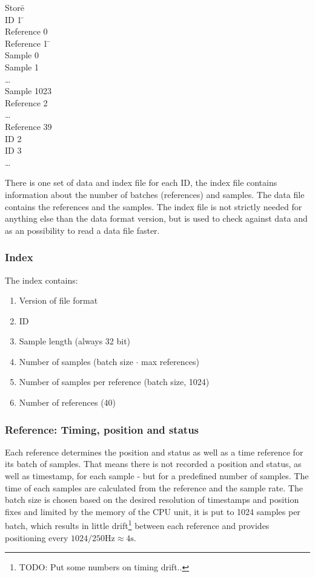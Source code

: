 \documentclass[a4paper]{article}
\begin{document}
\begin{multicols}{2}
    \begin{tabbing}
    Store\= \+ \\
      ID 1 \=  \+ \\
        Reference 0 \= \\
        Reference 1 \= \+ \\
          Sample 0 \\
          Sample 1 \\
          \dots \\
          Sample 1023 \- \\
        Reference 2 \\
        \dots \\
        Reference 39 \- \\
      ID 2 \\
      ID 3 \\
      \dots
    \end{tabbing}
    \label{tbl:store_structure}

    There is one set of data and index file for each ID, the index file
    contains information about the number of batches (references) and
    samples. The data file contains the references and the samples.
    The index file is not strictly needed for anything else than
    the data format version, but is used to check against data and as an
    possibility to read a data file faster.

    \subsubsection{Index}
    The index contains:
    \begin{enumerate}
      \item Version of file format
      \item ID
      \item Sample length (always 32 bit)
      \item Number of samples (batch size $\cdot$ max references)
      \item Number of samples per reference (batch size, 1024)
      \item Number of references (40)
    \end{enumerate}

    \subsubsection{Reference: Timing, position and status}
    Each reference determines the position and status as well as a
    time reference for its batch of samples. That means there is not
    recorded a position and status, as well as timestamp, for each
    sample - but for a predefined number of samples. The
    time of each samples are calculated from the reference and the
    sample rate. The batch size is chosen based on the desired resolution of
    timestamps and position fixes and limited by the memory of the CPU
    unit, it is put to 1024 samples per batch, which
    results in little drift\footnote{TODO: Put some numbers on timing drift..} between each reference and provides
    positioning every $1024 / 250 \text{Hz} \approx 4 \text{s}$.


\end{multicols}
\end{document}
